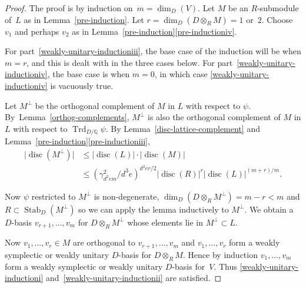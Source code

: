 \documentclass[JEP,XML,SOM,Unicode,NoFloatCountersInSection]{cedram}
\newcommand{\bQ}{\mathbb{Q}}
\DeclareMathOperator{\disc}{disc}
\DeclareMathOperator{\Stab}{Stab}
\DeclareMathOperator{\Trd}{Trd}
\newcommand{\abs}[1]{\lvert #1 \rvert}
\begin{document}
\begin{proof}
The proof is by induction on~$m = \dim_D(V)$.
Let $M$ be an $R$-submodule of~$L$ as in Lemma~\ref{pre-induction}.
Let $r = \dim_D(D \otimes_R M) = 1$ or~$2$.
Choose $v_1$ and perhaps $v_2$ as in Lemma~\ref{pre-induction}\eqref{pre-inductioniv}.

For part~\eqref{weakly-unitary-inductioniii}, the base case of the induction will be when $m=r$, and this is dealt with in the three cases below.
For part~\eqref{weakly-unitary-inductioniv}, the base case is when $m=0$, in which case \eqref{weakly-unitary-inductioniv} is vacuously true.

Let $M^\perp$ be the orthogonal complement of $M$ in $L$ with respect to $\psi$.
By~Lem\-ma~\ref{orthog-complements}, $M^\perp$ is also the orthogonal complement of $M$ in $L$ with respect to $\Trd_{D/\bQ} \psi$.
By Lemma~\ref{disc-lattice-complement} and Lemma~\ref{pre-induction}\eqref{pre-inductioniii},\vspace*{-3pt}\enlargethispage{.5\baselineskip}
\begin{equation} \label{eqn:disc-Mperp}
\begin{split}
\abs{\disc(M^\perp)} &\leq \abs{\disc(L)} \cdot \abs{\disc(M)}\\
&\leq (\gamma_{d^2em}^2/d^3e)^{d^2er/2} \abs{\disc(R)}^r \abs{\disc(L)}^{(m+r)/m}.
\end{split}
\end{equation}

Now $\psi$ restricted to $M^\perp$ is non-degenerate, $\dim_D(D \otimes_R M^\perp) = m-r < m$ and $R \subset \Stab_D(M^\perp)$ so we can apply the lemma inductively to $M^\perp$.
We obtain a $D$-basis $v_{r+1}, \dotsc, v_m$ for $D \otimes_R M^\perp$ whose elements lie in $M^\perp \subset L$.

Now $v_1, \dotsc, v_r \in M$ are orthogonal to $v_{r+1}, \dotsc, v_m$ and $v_1, \dotsc, v_r$ form a weakly symplectic or weakly unitary $D$-basis for $D \otimes_R M$.
Hence by induction $v_1, \dotsc, v_m$ form a weakly symplectic or weakly unitary $D$-basis for~$V$.
Thus \eqref{weakly-unitary-inductioni} and~\eqref{weakly-unitary-inductionii} are satisfied.


\end{proof}
\end{document}

